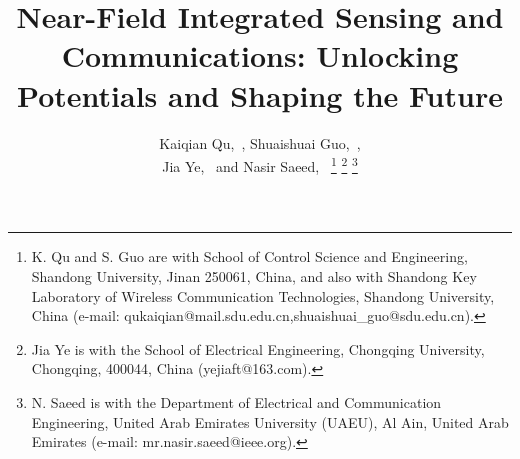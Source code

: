 \documentclass[10pt,journal,twocolumn,twoside]{IEEEtran} %
\begin{document}
\title
{Near-Field Integrated Sensing and Communications:  Unlocking Potentials and Shaping the Future}


\author{ Kaiqian Qu,~,  Shuaishuai Guo,~, \\Jia Ye,~  and Nasir Saeed,~ 
\thanks{ 
K. Qu and S. Guo are  with School of Control Science and Engineering, Shandong University, Jinan 250061, China, and also with Shandong Key Laboratory of Wireless Communication Technologies, Shandong University, China (e-mail: qukaiqian@mail.sdu.edu.cn,shuaishuai\_guo@sdu.edu.cn). }
\thanks{Jia Ye is with the School of Electrical Engineering, Chongqing University, Chongqing, 400044, China (yejiaft@163.com).}
\thanks{N. Saeed is with the Department of Electrical and Communication Engineering, United Arab Emirates University (UAEU), Al Ain, United Arab Emirates (e-mail: mr.nasir.saeed@ieee.org).}
   }
\maketitle

\end{document}
